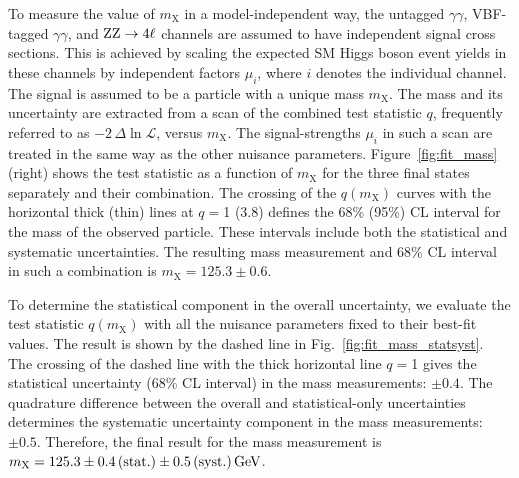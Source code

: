 \documentclass[11pt,twoside,a4paper,cmspaper,final,collab]{cms-tdr}
\begin{document}
To measure the value of $m_{\mathrm{X}}$ in a model-independent way,
the untagged $\gamma\gamma$, VBF-tagged $\gamma\gamma$, and $\mathrm{Z}\mathrm{Z} \to 4\ell$
channels are assumed to have independent signal cross sections.
This is achieved by scaling the expected SM Higgs boson event yields
in these channels by independent factors $\mu_i$,
where $i$ denotes the individual channel.
The signal is assumed to be a particle with a unique mass $m_{\mathrm{X}}$.
The mass and its uncertainty are extracted from a scan of the combined
test statistic $q$, frequently referred to as $-2 \, \Delta \ln \mathcal{L}$, versus $m_{\mathrm{X}}$.
The signal-strengths $\mu_i$ in such a scan are treated in the same way as the other nuisance parameters.
Figure~\ref{fig:fit_mass} (right) shows the test statistic
as a function of $m_{\mathrm{X}}$ for the three final states separately and their combination.
The crossing of the $q(m_{\mathrm{X}})$ curves with the horizontal thick (thin) lines at $q=$1 (3.8) defines
the 68\% (95\%) CL interval for the mass of the observed particle. These intervals include
both the statistical and systematic uncertainties.
The resulting mass measurement and 68\% CL interval in such a combination is $m_{\mathrm{X}} = 125.3 \pm 0.6$\GeV.

To determine the statistical component in the overall uncertainty, we evaluate
the test statistic $q(m_{\mathrm{X}})$ with all the nuisance parameters fixed to their best-fit values.
The result is shown by the dashed line in Fig.~\ref{fig:fit_mass_statsyst}.
The crossing of the dashed line with the thick horizontal line
$q=$1 gives the statistical uncertainty
(68\% CL interval) in the
mass measurements: $\pm 0.4$\GeV. The quadrature difference
between the overall and statistical-only uncertainties determines
the systematic uncertainty component in the mass measurements: ${\pm}0.5$\GeV.
Therefore, the final result for the mass measurement is $m_{\mathrm{X}}= 125.3 \pm 0.4\,\text{(stat.)}\pm 0.5\,\text{(syst.)}\,\text{Ge\hspace{-.08em}V}$.
\end{document}
